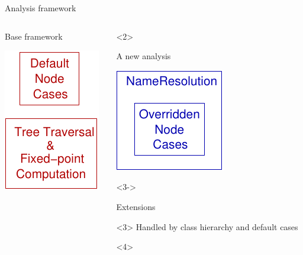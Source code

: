\begin{frame}[t]{Analysis framework}
  \begin{columns}[T]
    \begin{column}{5cm}
      \begin{block}{Base framework}
        \begin{center}
          \includegraphics{images/analysis_left.pdf}
        \end{center}
      \end{block}
    \end{column}
    \begin{column}{5cm}
      \begin{onlyenv}<2>
        \begin{block}{A new analysis}
          \begin{center}
            \includegraphics{images/analysis_right.pdf}
          \end{center}
        \end{block}
      \end{onlyenv}
      \begin{onlyenv}<3->
        \begin{block}{Extensions}
          \begin{center}
            \begin{onlyenv}<3>
              Handled by class hierarchy and default cases
            \end{onlyenv}
            \begin{onlyenv}<4>

\end{onlyenv}
\end{center}
\end{block}
\end{onlyenv}
\end{column}
\end{columns}
\end{frame}
